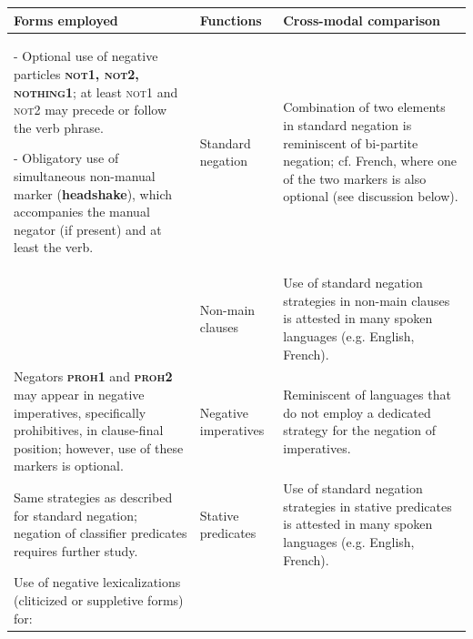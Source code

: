 \documentclass[output=paper,colorlinks,citecolor=brown]{langscibook}
\begin{document}
\begin{table}
    \scriptsize
    \begin{tabularx}{\textwidth}{p{9cm}>{\raggedright}p{1.5cm}X}
\lsptoprule
        Forms employed & Functions & Cross-modal comparison \\
\midrule
                - Optional use of negative particles \textbf{\textsc{not1, not2, nothing1}}; at least \textsc{not1} and \textsc{not2} may precede or follow the verb phrase.
                
                - Obligatory use of simultaneous non-manual marker (\textbf{headshake}), which accompanies the manual negator (if present) and at least the verb.
        
        & Standard negation 
        & Combination of two elements in standard negation is reminiscent of bi-partite negation; cf. French, where one of the two markers is also optional (see discussion below). \\
\tablevspace
        & Non-main clauses 
        & Use of standard negation strategies in non-main clauses is attested in many spoken languages (e.g. English, French). \\ 
\midrule
        Negators \textbf{\textsc{proh1}} and \textbf{\textsc{proh2}} may appear in negative imperatives, specifically prohibitives, in clause-final position; however, use of these markers is optional. 
        & Negative imperatives 
        & Reminiscent of languages that do not employ a dedicated strategy for the negation of imperatives. \\ 
\midrule        
        Same strategies as described for standard negation; negation of classifier predicates requires further study. 
        & Stative predicates 
        & Use of standard negation strategies in stative predicates is attested in many spoken languages (e.g. English, French). \\ 
\midrule    
        Use of negative lexicalizations (cliticized or suppletive forms) for: %
                

\end{tabularx}
\end{table}
\end{document}
